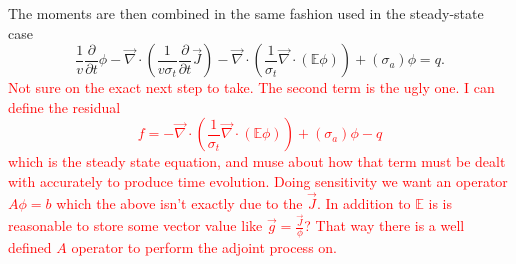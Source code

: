 \documentclass[12pt]{report}
\renewcommand{\div}{\vec{\nabla} \cdot}
\newcommand{\Edd}{\mathbb{E}}
\newcommand{\sigt}{\sigma_t}
\newcommand{\siga}{\sigma_a}
\newcommand{\scalSource}{q}
\newcommand{\comment}[2]{\marginpar{\textcolor{#2}{$\star$}}\textcolor{#2}{#1}\newline}
\newcommand{\iwh}[1]{\comment{#1}{red}}
\newcommand{\iwh}[1]{\phantom{a}}
\begin{document}
The moments are then combined in the same fashion used in the steady-state case
\begin{equation}
\label{VETTrans}
\frac{1}{v} \frac{\partial}{\partial t}\phi - \div \left( \frac{1}{v \sigt} \frac{\partial}{\partial t}\vec{J} \right)   - \div \left( \frac{1}{\sigt} \div \left( \Edd \phi \right) \right)  + (\siga) \phi = \scalSource.
\end{equation}
\iwh{Not sure on the exact next step to take. The second term is the ugly one. I can define the residual 
\begin{equation}
f=- \div \left( \frac{1}{\sigt} \div \left( \Edd \phi \right) \right)  + (\siga) \phi - \scalSource
\end{equation}
which is the steady state equation, and muse about how that term must be dealt with accurately to produce time evolution. 
Doing sensitivity we want an operator $A \phi = b$ which the above isn't exactly due to the $\vec{J}$. In addition to $\Edd$ is is reasonable to store some vector value like $\vec{g}=\frac{\vec{J}}{\phi}$? That way there is a well defined $A$ operator to perform the adjoint process on.}

%


% 
%

\let\oldbibitem\bibitem
\renewcommand{\bibitem}{\setlength{\itemsep}{0pt}\oldbibitem}


{}

\renewcommand{\bibname}{{\normalsize\rm REFERENCES}}






%
\end{document}
